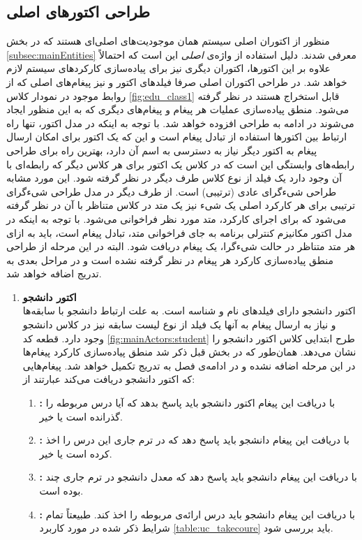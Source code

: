 \subsection{طراحی اکتور‌های اصلی}
منظور از اکتوران اصلی سیستم همان موجودیت‌های اصلی‌ای هستند که در بخش \ref{subsec:mainEntities} معرفی شدند. دلیل استفاده از واژه‌ی \textit{اصلی}  این است که احتمالاً علاوه بر این اکتورها، اکتوران دیگری نیز برای پیاده‌سازی کارکردهای سیستم لازم خواهد شد. در طراحی اکتوران اصلی صرفا فیلد‌های اکتور و نیز پیغام‌های اصلی که از روابط موجود در نمودار کلاس \ref{fig:edu_class1} قابل استخراج هستند در نظر گرفته ‌می‌شود. منطق پیاده‌سازی عملیات هر پیغام و  پیغام‌های دیگری که به این منظور ایجاد می‌شوند در ادامه به طراحی افزوده خواهد شد. 
با توجه به اینکه در مدل اکتور،‌ تنها راه ارتباط بین اکتور‌ها استفاده از تبادل پیغام است و این که یک اکتور برای امکان ارسال پیغام به اکتور دیگر نیاز به دسترسی به اسم آن دارد، بهترین راه برای طراحی رابطه‌های وابستگی این است که در کلاس یک اکتور برای هر کلاس دیگر که رابطه‌ای با آن وجود دارد یک فیلد از نوع کلاس طرف دیگر در نظر گرفته شود. این مورد مشابه طراحی شیءگرای عادی (ترتیبی) است. از طرف دیگر در مدل طراحی شیءگرای ترتیبی برای هر کارکرد اصلی یک شیء نیز یک متد در کلاس متناظر با آن در نظر گرفته می‌شود که برای اجرای کارکرد، متد مورد نظر فراخوانی می‌شود. با توجه به اینکه در مدل اکتور مکانیزم کنترلی برنامه به جای فراخوانی متد، تبادل پیغام است، باید به ازای هر متد متناظر در حالت شیءگرا، یک پیغام دریافت شود. البته در این مرحله از طراحی منطق پیاده‌سازی کارکرد هر پیغام در نظر گرفته نشده است و در مراحل بعدی به تدریج اضافه خواهد شد.
\begin{enumerate}
\item\textbf{اکتور دانشجو}\\
اکتور دانشجو دارای فیلد‌های نام و شناسه است. به علت ارتباط دانشجو با سابقه‌ها و نیاز  به ارسال پیغام به آنها یک فیلد از نوع لیست سابقه نیز در کلاس دانشجو وجود دارد. قطعه کد \ref{fig:mainActors:student} طرح ابتدایی کلاس اکتور دانشجو را نشان می‌دهد. همان‌طور که در بخش قبل ذکر شد منطق پیاده‌سازی کارکرد پیغام‌ها در این مرحله اضافه نشده و در ادامه‌ی فصل به تدریج تکمیل خواهد شد. پیغام‌هایی که اکتور دانشجو دریافت می‌کند عبارتند از:
\begin{enumerate}
\item\textbf{:}
با دریافت این پیغام اکتور دانشجو باید پاسخ بدهد که آیا درس مربوطه را گذرانده است یا خیر.
\item\textbf{:}
با دریافت این پیغام دانشجو باید پاسخ دهد که در ترم جاری این درس را اخذ کرده است یا خیر.
\item\textbf{:}
با دریافت این پیغام دانشجو باید پاسخ دهد که معدل دانشجو در ترم جاری  چند بوده است.
\item\textbf{:}
با دریافت این پیغام دانشجو باید درس ارائه‌ی مربوطه را اخذ کند. طبیعتاً تمام شرایط ذکر شده در مورد کاربرد \ref{table:uc_takecoure} باید بررسی شود.
\end{enumerate}




\end{enumerate}
